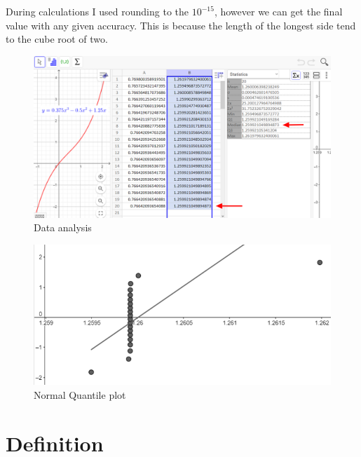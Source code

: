 \documentclass[12pt, letterpaper, oneside]{report}
\begin{document}
During calculations I used rounding to the  $10^{-15}$, however we can get the final value with any given accuracy. This is because the length of the longest side tend to the cube root of two.
\\
\begin{figure}[h]
	\centering
	\includegraphics[width=0.9\linewidth]{Table_arrow.png}
	\caption{Data analysis}
	\label{fig:data}
\end{figure}
\begin{figure}[h]
	\centering
	\includegraphics[width=0.9\linewidth]{plot.png}
	\caption{Normal Quantile plot}
	\label{fig:plot}
\end{figure}
\newpage

\section{Definition}
\end{document}
